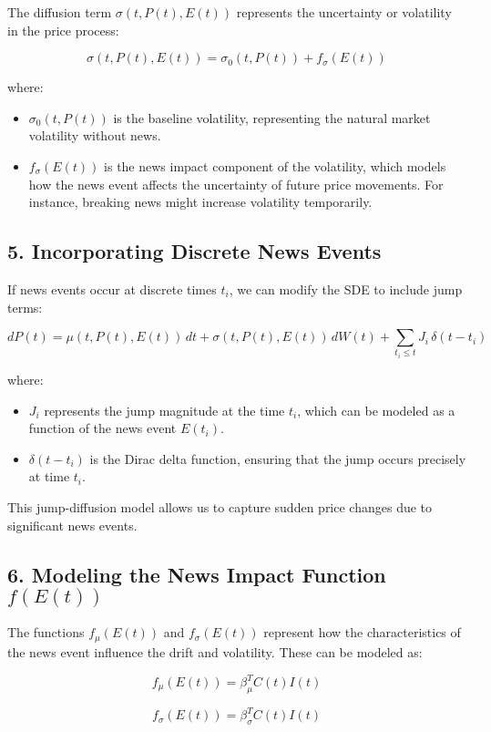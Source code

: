 \documentclass[12pt,article]{memoir}
\begin{document}
The diffusion term \(\sigma(t, P(t), E(t))\) represents the uncertainty or volatility in the price process:

\[
\sigma(t, P(t), E(t)) = \sigma_0(t, P(t)) + f_{\sigma}(E(t))
\]

where:
\begin{itemize}
    \item \(\sigma_0(t, P(t))\) is the baseline volatility, representing the natural market volatility without news.
    \item \(f_{\sigma}(E(t))\) is the news impact component of the volatility, which models how the news event affects the uncertainty of future price movements. For instance, breaking news might increase volatility temporarily.
\end{itemize}

\subsection*{5. Incorporating Discrete News Events}

If news events occur at discrete times \(t_i\), we can modify the SDE to include jump terms:

\[
dP(t) = \mu(t, P(t), E(t)) \, dt + \sigma(t, P(t), E(t)) \, dW(t) + \sum_{t_i \leq t} J_i \, \delta(t - t_i)
\]

where:
\begin{itemize}
    \item \(J_i\) represents the jump magnitude at the time \(t_i\), which can be modeled as a function of the news event \(E(t_i)\).
    \item \(\delta(t - t_i)\) is the Dirac delta function, ensuring that the jump occurs precisely at time \(t_i\).
\end{itemize}

This jump-diffusion model allows us to capture sudden price changes due to significant news events.

\subsection*{6. Modeling the News Impact Function \(f(E(t))\)}

The functions \(f_{\mu}(E(t))\) and \(f_{\sigma}(E(t))\) represent how the characteristics of the news event influence the drift and volatility. These can be modeled as:

\[
f_{\mu}(E(t)) = \beta_{\mu}^T C(t) I(t)
\]

\[
f_{\sigma}(E(t)) = \beta_{\sigma}^T C(t) I(t)
\]
\end{document}
